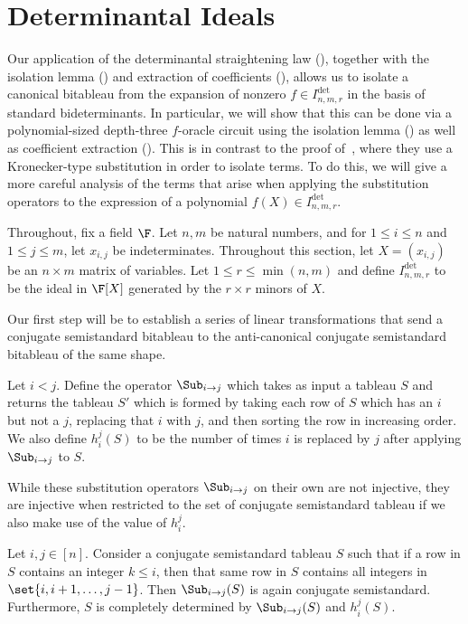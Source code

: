\documentclass[letterpaper, 11pt]{amsart}
\begin{document}
\section{Determinantal Ideals}\label{sec:det}

Our application of the determinantal straightening law  (), together with the isolation lemma () and extraction of coefficients (), allows us to isolate a canonical bitableau from the expansion of nonzero $f \in I^{\det}_{n, m, r}$ in the basis of standard bideterminants.
In particular, we will show that this can be done via a polynomial-sized depth-three $f$-oracle circuit using the isolation lemma () as well as coefficient extraction ().
This is in contrast to the proof of~\cite{AF21}, where they use a Kronecker-type substitution in order to isolate terms.
To do this, we will give a more careful analysis of the terms that arise when applying the substitution operators to the expression of a polynomial $f(X) \in I^{\det}_{n, m, r}$.

Throughout, fix a field $\F$.
Let $n, m$ be natural numbers, and for $1 \leq i \leq n$ and $1 \leq j \leq m$, let $x_{i, j}$ be indeterminates.
Throughout this section, let $X = (x_{i, j})$ be an $n \times m$ matrix of variables.
Let $1 \leq r \leq \min(n, m)$ and define $I^{\det}_{n, m, r}$ to be the ideal in $\F[X]$ generated by the $r \times r$ minors of $X$.

Our first step will be to establish a series of linear transformations that send a conjugate semistandard bitableau to the anti-canonical conjugate semistandard bitableau of the same shape.
\begin{defn}\label{defn:sub}
    Let $i < j$.
    Define the operator $\Sub_{i \to j}$ which takes as input a tableau $S$ and returns the tableau $S'$ which is formed by taking each row of $S$ which has an $i$ but not a $j$, replacing that $i$ with $j$, and then sorting the row in increasing order.
    We also define $h_{i}^{j}(S)$ to be the number of times $i$ is replaced by $j$ after applying $\Sub_{i \to j}$ to $S$.
\end{defn}

While these substitution operators $\Sub_{i \to j}$ on their own are not injective, they are injective when restricted to the set of conjugate semistandard tableau if we also make use of the value of $h_{i}^{j}$.
\begin{lem}\label{lem:sub_injective}
    Let $i, j \in [n]$.
    Consider a conjugate semistandard tableau $S$ such that if a row in $S$ contains an integer $k \leq i$, then that same row in $S$ contains all integers in $\set{i, i + 1, \ldots, j - 1}$.
    Then $\Sub_{i \to j}(S)$ is again conjugate semistandard. 
    Furthermore, $S$ is completely determined by $\Sub_{i \to j}(S)$ and $h_{i}^{j}(S)$.
\end{lem}
\end{document}
